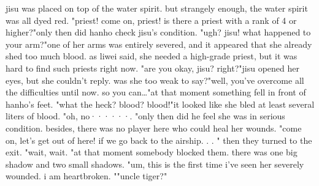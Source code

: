 jisu was placed on top of the water spirit.
but strangely enough, the water spirit was all dyed red.
"priest! come on, priest! is there a priest with a rank of 4 or higher?"only then did hanho check jisu's condition.
"ugh? jisu! what happened to your arm?"one of her arms was entirely severed, and it appeared that she already shed too much blood.
as liwei said, she needed a high-grade priest, but it was hard to find such priests right now.
"are you okay, jisu? right?"jisu opened her eyes, but she couldn't reply.
 was she too weak to say?"well, you've overcome all the difficulties until now.
 so you can…"at that moment something fell in front of hanho's feet.
"what the heck? blood? blood!"it looked like she bled at least several liters of blood.
"oh, no······.
"only then did he feel she was in serious condition.
 besides, there was no player here who could heal her wounds.
"come on, let's get out of here! if we go back to the airship.
.
.
" then they turned to the exit.
"wait, wait.
"at that moment somebody blocked them.
 there was one big shadow and two small shadows.
"um, this is the first time i've seen her severely wounded.
 i am heartbroken.
""uncle tiger?"

 